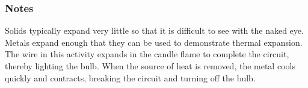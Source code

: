 \subsubsection*{Notes}
Solids typically expand very little so that it is difficult to see with the naked eye. Metals expand enough that they can be used to demonstrate thermal expansion. The wire in this activity expands in the candle flame to complete the circuit, thereby lighting the bulb. When the source of heat is removed, the metal cools quickly and contracts, breaking the circuit and turning off the bulb.
